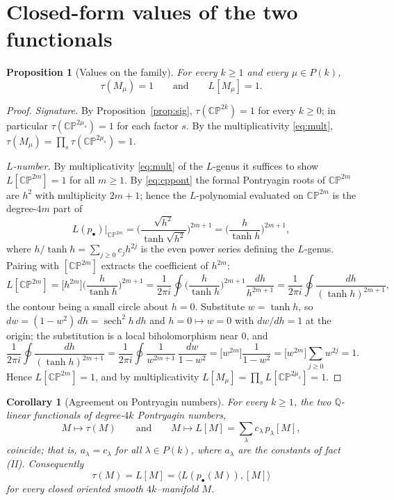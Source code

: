 \documentclass[12pt]{article}
\newtheorem{proposition}{Proposition}
\newtheorem{corollary}{Corollary}
\theoremstyle{definition}
\begin{document}
\bigskip

\section{Closed-form values of the two functionals}

\begin{proposition}[Values on the family]\label{prop:values}
For every $k\ge 1$ and every $\mu\in P(k)$,
\[
\tau(M_\mu)=1
\qquad\text{and}\qquad
L[M_\mu]=1.
\]
\end{proposition}

\begin{proof}
\emph{Signature.}  By Proposition~\ref{prop:sig}, $\tau(\mathbb{CP}^{2k})=1$ for every
$k\ge0$; in particular $\tau(\mathbb{CP}^{2\mu_s})=1$ for each factor $s$.  By the
multiplicativity \eqref{eq:mult}, $\tau(M_\mu)=\prod_s\tau(\mathbb{CP}^{2\mu_s})=1$.

\emph{$L$-number.}  By multiplicativity \eqref{eq:mult} of the $L$-genus it suffices to
show $L[\mathbb{CP}^{2m}]=1$ for all $m\ge 1$.  By \eqref{eq:cppont} the formal
Pontryagin roots of $\mathbb{CP}^{2m}$ are $h^2$ with multiplicity $2m+1$; hence the
$L$-polynomial evaluated on $\mathbb{CP}^{2m}$ is the degree-$4m$ part of
\[
L(p_\bullet)\Big|_{\mathbb{CP}^{2m}}
=\Big(\frac{\sqrt{h^2}}{\tanh\sqrt{h^2}}\Big)^{2m+1}
=\Big(\frac{h}{\tanh h}\Big)^{2m+1},
\]
where $h/\tanh h=\sum_{j\ge 0}c_j h^{2j}$ is the even power series defining the $L$-genus.
Pairing with $[\mathbb{CP}^{2m}]$ extracts the coefficient of $h^{2m}$:
\[
L[\mathbb{CP}^{2m}]=\big[h^{2m}\big]\Big(\frac{h}{\tanh h}\Big)^{2m+1}
=\frac{1}{2\pi i}\oint \Big(\frac{h}{\tanh h}\Big)^{2m+1}\frac{dh}{h^{2m+1}}
=\frac{1}{2\pi i}\oint\frac{dh}{(\tanh h)^{2m+1}},
\]
the contour being a small circle about $h=0$.  Substitute $w=\tanh h$, so
$dw=(1-w^2)\,dh=\operatorname{sech}^2 h\,dh$ and $h=0\mapsto w=0$ with $dw/dh=1$ at the
origin; the substitution is a local biholomorphism near $0$, and
\[
\frac{1}{2\pi i}\oint\frac{dh}{(\tanh h)^{2m+1}}
=\frac{1}{2\pi i}\oint\frac{1}{w^{2m+1}}\,\frac{dw}{1-w^2}
=\big[w^{2m}\big]\frac{1}{1-w^2}
=\big[w^{2m}\big]\sum_{j\ge0}w^{2j}=1.
\]
Hence $L[\mathbb{CP}^{2m}]=1$, and by multiplicativity
$L[M_\mu]=\prod_s L[\mathbb{CP}^{2\mu_s}]=1$.
\end{proof}

\begin{corollary}[Agreement on Pontryagin numbers]\label{cor:agree}
For every $k\ge 1$, the two $\mathbb{Q}$-linear functionals of degree-$4k$ Pontryagin
numbers,
\[
M\longmapsto\tau(M)
\qquad\text{and}\qquad
M\longmapsto L[M]=\sum_\lambda c_\lambda\,p_\lambda[M],
\]
coincide; that is, $a_\lambda=c_\lambda$ for all $\lambda\in P(k)$, where $a_\lambda$ are
the constants of fact \textnormal{(II)}.  Consequently
\[
\tau(M)=L[M]=\big\langle L(p_\bullet(M)),[M]\big\rangle
\]
for every closed oriented smooth $4k$--manifold $M$.
\end{corollary}
\end{document}
